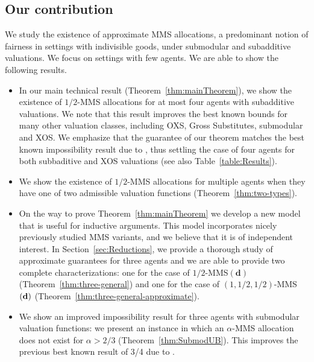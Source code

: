\subsection{Our contribution}

We study the existence of approximate MMS allocations, a predominant notion of fairness in settings with indivisible goods, under submodular
and subadditive valuations. We focus on settings with few agents. We are able to show the following results.

\begin{itemize}
    \item In our main technical result (Theorem~\ref{thm:mainTheorem}), we show the existence of $1/2$-MMS allocations for at most four agents with subadditive valuations. We note that this result improves the best known bounds for many other valuation classes, including OXS, Gross Substitutes, submodular and XOS. We emphasize that the guarantee of our theorem matches the best known impossibility result due to \cite{GhodsiHSSY22}, thus settling the case of four agents for both subbaditive and XOS valuations (see also Table~\ref{table:Results}). 

    \item We show the existence of $1/2$-MMS allocations for multiple agents when they have one of two admissible valuation functions (Theorem~\ref{thm:two-types}).

    
    \item On the way to prove Theorem~\ref{thm:mainTheorem} we develop a new model that is useful for inductive arguments. This model incorporates nicely previously studied MMS variants, and we believe that it is of independent interest. In Section~\ref{sec:Reductions}, we provide a thorough study of approximate guarantees for three agents and we are able to provide two complete characterizations: one for the case of $1/2$-MMS$(\mathbf{d})$ (Theorem~\ref{thm:three-general}) and one for the case of $(1,1/2,1/2)$-MMS$(\bf d)$ (Theorem~\ref{thm:three-general-approximate}). 

    \item We show an improved impossibility result for three agents with submodular valuation functions: we present an instance in which an $\alpha$-MMS allocation does not exist for $\alpha > 2/3$ (Theorem~\ref{thm:SubmodUB}). This improves the previous best known result of 3/4 due to \cite{GhodsiHSSY22}.

    
\end{itemize}


